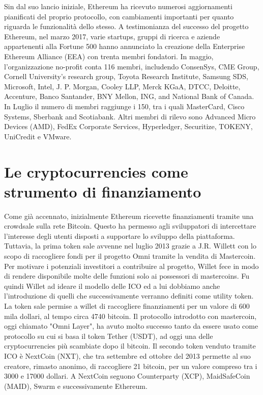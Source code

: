 Sin dal suo lancio iniziale, Ethereum ha ricevuto numerosi aggiornamenti pianificati del proprio protocollo, con cambiamenti importanti per quanto riguarda le funzionalità dello stesso. 
A testimonianza del successo del progetto Ethereum, nel marzo 2017, varie startups, gruppi di ricerca e aziende appartenenti alla Fortune 500 hanno annunciato la creazione della Enterprise Ethereum Alliance (EEA) con trenta membri fondatori. 
In maggio, l'organizzazione no-profit conta 116 membri, includendo ConsenSys, CME Group, Cornell University's research group, Toyota Research Institute, Samsung SDS, Microsoft, Intel, J. P. Morgan, Cooley LLP, Merck KGaA, DTCC, Deloitte, Accenture, Banco Santander, BNY Mellon, ING, and National Bank of Canada.
In Luglio il numero di membri raggiunge i 150, tra i quali MasterCard, Cisco Systems, Sberbank and Scotiabank. Altri membri di rilevo sono Advanced Micro Devices (AMD), FedEx Corporate Services, Hyperledger, Securitize, TOKENY, UniCredit e VMware.

\section{Le cryptocurrencies come strumento di finanziamento}
Come già accennato, inizialmente Ethereum ricevette finanziamenti tramite una crowdsale sulla rete Bitcoin.  Questo ha permesso agli sviluppatori di intercettare l'interesse degli utenti disposti a supportare lo sviluppo della piattaforma. Tuttavia, la prima token sale avvenne nel luglio 2013 grazie a J.R. Willett con lo scopo di raccogliere fondi per il progetto Omni tramite la vendita di Mastercoin\cite{K23}. Per motivare i potenziali investitori a contribuire al progetto, Willet fece in modo di rendere disponibile molte delle funzioni solo ai possessori di mastercoins. Fu quindi Willet ad ideare il modello delle ICO ed a lui dobbiamo anche l'introduzione di quelli che successivamente verranno definiti come utility token. La token sale permise a willet di raccogliere finanziamenti per un valore di 600 mila dollari, al tempo circa 4740 bitcoin. Il protocollo introdotto con mastercoin, oggi chiamato "Omni Layer", ha avuto molto successo tanto da essere usato come protocollo su cui si basa il token Tether (USDT), ad oggi una delle cryptocurrencies più scambiate dopo il bitcoin\cite{K24}. 
Il secondo token venduto tramite ICO è NextCoin (NXT), che tra settembre ed ottobre del 2013 permette al suo creatore, rimasto anonimo, di raccogliere 21 bitcoin, per un valore compreso tra i 3000 e 17000 dollari. A NextCoin seguono Counterparty (XCP), MaidSafeCoin (MAID), Swarm e successivamente Ethereum.\cite{K25,K26,K27,K28}

